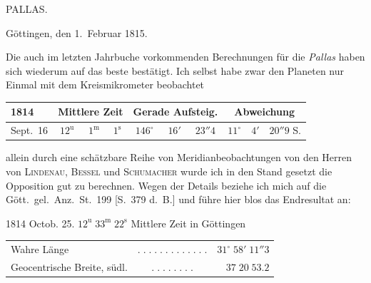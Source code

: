\par{}\bigskip
\hypertarget{native-388-lower}{}\label{native-388-lower}
\begin{center}
\large PALLAS.
\end{center}

\begin{flushright}
Göttingen, den 1.\ Februar 1815.
\end{flushright}

\par\indent Die auch im letzten Jahrbuche vorkommenden Berechnungen für die \emph{Pallas} haben sich wiederum auf das beste bestätigt. Ich selbst habe zwar den Planeten nur Einmal mit dem Kreismikrometer beobachtet

\begin{center}
\fontsize{9}{11}\selectfont\setlength{\tabcolsep}{3pt}\renewcommand{\arraystretch}{1.15}\begin{tabular}{l|ccc|ccc|ccc}
1814 & \multicolumn{3}{c|}{Mittlere Zeit} & \multicolumn{3}{c|}{Gerade Aufsteig.} & \multicolumn{3}{c}{Abweichung} \\
\hline
Sept.\ 16 & $12^{\mathrm u}$ & $1^{\mathrm m}$ & $1^{\mathrm s}$ & $146^\circ$ & $16'$ & $23''4$ & $11^\circ$ & $4'$ & $20''9$ S. \\
\end{tabular}
\end{center}

\noindent allein durch eine schätzbare Reihe von Meridianbeobachtungen von den Herren von \textsc{Lindenau}, \textsc{Bessel} und \textsc{Schumacher} wurde ich in den Stand gesetzt die Opposition gut zu berechnen. Wegen der Details beziehe ich mich auf die Gött.\ gel.\ Anz.\ St.\ 199 [S.\ 379 d.\ B.] und führe hier blos das Endresultat an:

\begin{center}1814 Octob. 25. $12^{\mathrm u}\;33^{\mathrm m}\;22^{\mathrm s}$ Mittlere Zeit in Göttingen\end{center}
\begin{center}\fontsize{10}{12}\selectfont\setlength{\tabcolsep}{3pt}\renewcommand{\arraystretch}{1.15}\begin{tabular}{lcr}
Wahre Länge & $.\;.\;.\;.\;.\;.\;.\;.\;.\;.\;.\;.\;.$ & $31^\circ\;58'\;11''3$\\
Geocentrische Breite, südl. & $.\;.\;.\;.\;.\;.\;.\;.$ & $37\;20\;53.2$\\
\end{tabular}\end{center}

